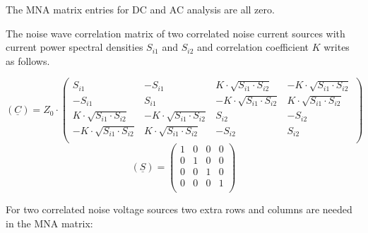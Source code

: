 The MNA matrix entries for DC and AC analysis are all zero.

\addvspace{12pt}

The noise wave correlation matrix of two correlated noise current
sources with current power spectral densities $S_{i1}$ and $S_{i2}$
and correlation coefficient $K$ writes as follows.

\begin{equation}
(\underline{C}) = Z_0\cdot
\begin{pmatrix}
 S_{i1} & -S_{i1} &  K\cdot\sqrt{S_{i1}\cdot S_{i2}} & -K\cdot\sqrt{S_{i1}\cdot S_{i2}} \\
-S_{i1} &  S_{i1} & -K\cdot\sqrt{S_{i1}\cdot S_{i2}} &  K\cdot\sqrt{S_{i1}\cdot S_{i2}} \\
 K\cdot\sqrt{S_{i1}\cdot S_{i2}} & -K\cdot\sqrt{S_{i1}\cdot S_{i2}} &  S_{i2} & -S_{i2} \\
-K\cdot\sqrt{S_{i1}\cdot S_{i2}} &  K\cdot\sqrt{S_{i1}\cdot S_{i2}} & -S_{i2} &  S_{i2} \\
\end{pmatrix}
\end{equation}
\begin{equation}
(\underline{S}) =
\begin{pmatrix}
 1 & 0 & 0 & 0 \\
 0 & 1 & 0 & 0 \\
 0 & 0 & 1 & 0 \\
 0 & 0 & 0 & 1 \\
\end{pmatrix}
\end{equation}

For two correlated noise voltage sources two extra
rows and columns are needed in the MNA matrix:

